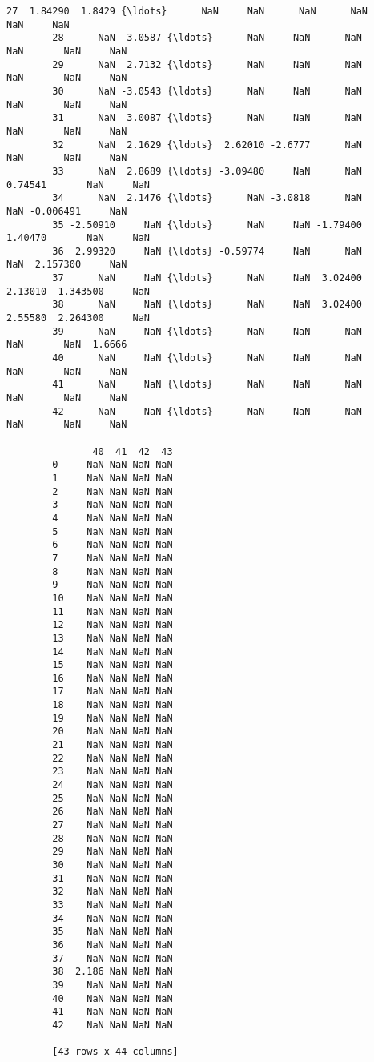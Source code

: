\documentclass[11pt]{article}
\begin{document}
\begin{Verbatim}[commandchars=\\\{\}]
        27  1.84290  1.8429 {\ldots}      NaN     NaN      NaN      NaN       NaN     NaN   
        28      NaN  3.0587 {\ldots}      NaN     NaN      NaN      NaN       NaN     NaN   
        29      NaN  2.7132 {\ldots}      NaN     NaN      NaN      NaN       NaN     NaN   
        30      NaN -3.0543 {\ldots}      NaN     NaN      NaN      NaN       NaN     NaN   
        31      NaN  3.0087 {\ldots}      NaN     NaN      NaN      NaN       NaN     NaN   
        32      NaN  2.1629 {\ldots}  2.62010 -2.6777      NaN      NaN       NaN     NaN   
        33      NaN  2.8689 {\ldots} -3.09480     NaN      NaN  0.74541       NaN     NaN   
        34      NaN  2.1476 {\ldots}      NaN -3.0818      NaN      NaN -0.006491     NaN   
        35 -2.50910     NaN {\ldots}      NaN     NaN -1.79400  1.40470       NaN     NaN   
        36  2.99320     NaN {\ldots} -0.59774     NaN      NaN      NaN  2.157300     NaN   
        37      NaN     NaN {\ldots}      NaN     NaN  3.02400  2.13010  1.343500     NaN   
        38      NaN     NaN {\ldots}      NaN     NaN  3.02400  2.55580  2.264300     NaN   
        39      NaN     NaN {\ldots}      NaN     NaN      NaN      NaN       NaN  1.6666   
        40      NaN     NaN {\ldots}      NaN     NaN      NaN      NaN       NaN     NaN   
        41      NaN     NaN {\ldots}      NaN     NaN      NaN      NaN       NaN     NaN   
        42      NaN     NaN {\ldots}      NaN     NaN      NaN      NaN       NaN     NaN   
        
               40  41  42  43  
        0     NaN NaN NaN NaN  
        1     NaN NaN NaN NaN  
        2     NaN NaN NaN NaN  
        3     NaN NaN NaN NaN  
        4     NaN NaN NaN NaN  
        5     NaN NaN NaN NaN  
        6     NaN NaN NaN NaN  
        7     NaN NaN NaN NaN  
        8     NaN NaN NaN NaN  
        9     NaN NaN NaN NaN  
        10    NaN NaN NaN NaN  
        11    NaN NaN NaN NaN  
        12    NaN NaN NaN NaN  
        13    NaN NaN NaN NaN  
        14    NaN NaN NaN NaN  
        15    NaN NaN NaN NaN  
        16    NaN NaN NaN NaN  
        17    NaN NaN NaN NaN  
        18    NaN NaN NaN NaN  
        19    NaN NaN NaN NaN  
        20    NaN NaN NaN NaN  
        21    NaN NaN NaN NaN  
        22    NaN NaN NaN NaN  
        23    NaN NaN NaN NaN  
        24    NaN NaN NaN NaN  
        25    NaN NaN NaN NaN  
        26    NaN NaN NaN NaN  
        27    NaN NaN NaN NaN  
        28    NaN NaN NaN NaN  
        29    NaN NaN NaN NaN  
        30    NaN NaN NaN NaN  
        31    NaN NaN NaN NaN  
        32    NaN NaN NaN NaN  
        33    NaN NaN NaN NaN  
        34    NaN NaN NaN NaN  
        35    NaN NaN NaN NaN  
        36    NaN NaN NaN NaN  
        37    NaN NaN NaN NaN  
        38  2.186 NaN NaN NaN  
        39    NaN NaN NaN NaN  
        40    NaN NaN NaN NaN  
        41    NaN NaN NaN NaN  
        42    NaN NaN NaN NaN  
        
        [43 rows x 44 columns]
\end{Verbatim}
            
\end{document}
